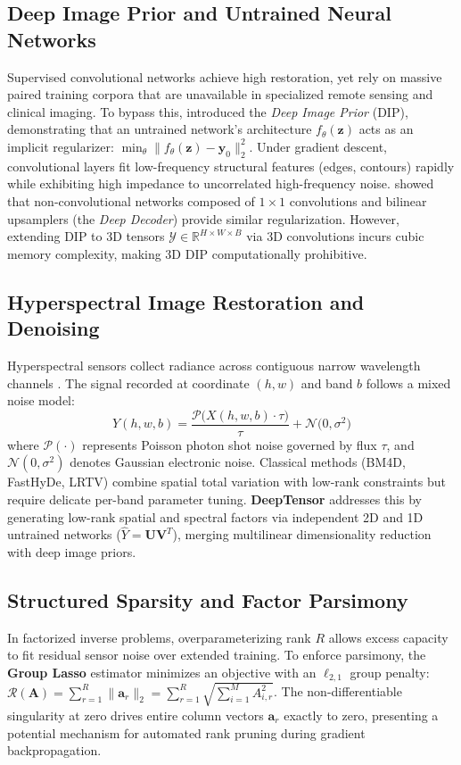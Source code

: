 \subsection{Deep Image Prior and Untrained Neural Networks}
Supervised convolutional networks achieve high restoration, yet rely on massive paired training corpora that are unavailable in specialized remote sensing and clinical imaging. To bypass this, \citet{ulyanov2018deep} introduced the \textit{Deep Image Prior} (DIP), demonstrating that an untrained network's architecture $f_\theta(\mathbf{z})$ acts as an implicit regularizer: $\min_\theta \|f_\theta(\mathbf{z}) - \mathbf{y}_0\|_2^2$. Under gradient descent, convolutional layers fit low-frequency structural features (edges, contours) rapidly while exhibiting high impedance to uncorrelated high-frequency noise. \citet{heckel2019deep} showed that non-convolutional networks composed of $1 \times 1$ convolutions and bilinear upsamplers (the \textit{Deep Decoder}) provide similar regularization. However, extending DIP to 3D tensors $\mathcal{Y} \in \mathbb{R}^{H \times W \times B}$ via 3D convolutions incurs cubic memory complexity, making 3D DIP computationally prohibitive.

\subsection{Hyperspectral Image Restoration and Denoising}
Hyperspectral sensors collect radiance across contiguous narrow wavelength channels \citep{bioucas2012hyperspectral}. The signal recorded at coordinate $(h, w)$ and band $b$ follows a mixed noise model:
\begin{equation}
Y(h, w, b) = \frac{\mathcal{P}\big(X(h, w, b) \cdot \tau\big)}{\tau} + \mathcal{N}\big(0, \sigma^2\big)
\end{equation}
where $\mathcal{P}(\cdot)$ represents Poisson photon shot noise governed by flux $\tau$, and $\mathcal{N}(0, \sigma^2)$ denotes Gaussian electronic noise. Classical methods (BM4D, FastHyDe, LRTV) combine spatial total variation with low-rank constraints but require delicate per-band parameter tuning. \textbf{DeepTensor} \citep{heckel2020deeptensor} addresses this by generating low-rank spatial and spectral factors via independent 2D and 1D untrained networks ($\hat{Y} = \mathbf{U} \mathbf{V}^T$), merging multilinear dimensionality reduction with deep image priors.

\subsection{Structured Sparsity and Factor Parsimony}
In factorized inverse problems, overparameterizing rank $R$ allows excess capacity to fit residual sensor noise over extended training. To enforce parsimony, the \textbf{Group Lasso} estimator \citep{yuan2006model} minimizes an objective with an $\ell_{2,1}$ group penalty: $\mathcal{R}(\mathbf{A}) = \sum_{r=1}^R \|\mathbf{a}_r\|_2 = \sum_{r=1}^R \sqrt{\sum_{i=1}^M A_{i, r}^2}$. The non-differentiable singularity at zero drives entire column vectors $\mathbf{a}_r$ exactly to zero, presenting a potential mechanism for automated rank pruning during gradient backpropagation.

